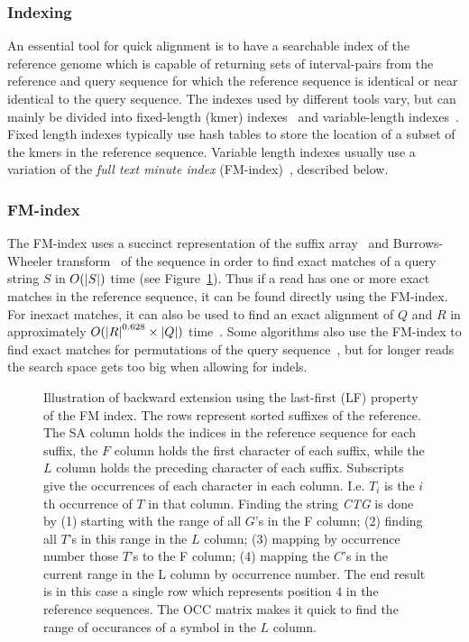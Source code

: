 \subsubsection{Indexing}
An essential tool for quick alignment is to have a searchable index of the reference genome which is capable of returning sets of interval-pairs from the reference and query sequence for which the reference sequence is identical or near identical to the query sequence.
The indexes used by different tools vary, but can mainly be divided into fixed-length (kmer) indexes~\cite{minimap} and variable-length indexes~\cite{bowtie2, bwalong}.
Fixed length indexes typically use hash tables to store the location of a subset of the kmers in the reference sequence.
Variable length indexes usually use a variation of the \emph{full text minute index} (FM-index)~\cite{fm}, described below.

\subsubsection{FM-index}
The FM-index uses a succinct representation of the suffix array~\cite{suffixarray} and Burrows-Wheeler transform~\cite{BWT} of the sequence in order to find exact matches of a query string $S$ in $O(\left|S\right|)$ time (see Figure~\ref{fig:FM}).
Thus if a read has one or more exact matches in the reference sequence, it can be found directly using the FM-index.
For inexact matches, it can also be used to find an exact alignment of $Q$ and $R$ in approximately $O(\left|R\right|^{0.628}\times\left|Q\right|)$ time~\cite{bwtsw, bwalong}.
Some algorithms also use the FM-index to find exact matches for permutations of the query sequence~\cite{bowtie1, bwashort}, but for longer reads the search space gets too big when allowing for indels.
\begin{figure}
  \tikzpicture
  
  \endtikzpicture
  \caption{Illustration of backward extension using the last-first (LF) property of the FM index.
    The rows represent sorted suffixes of the reference. The SA column holds the indices in the reference sequence for each suffix, the $F$ column holds the first character of each suffix, while the $L$ column holds the preceding character of each suffix.
    Subscripts give the occurrences of each character in each column. I.e. $T_i$ is the $i$th occurrence of $T$ in that column. Finding the string \emph{CTG} is done by (1) starting with the range of all $G$'s in the F column; (2) finding all $T$'s in this range in the $L$ column; (3) mapping by occurrence number those $T$'s to the F column; (4) mapping the $C$'s in the current range in the L column by occurrence number. The end result is in this case a single row which represents position $4$ in the reference sequences.
    The OCC matrix makes it quick to find the range of occurances of a symbol in the $L$ column.
  }
  \label{fig:FM}

\end{figure}

